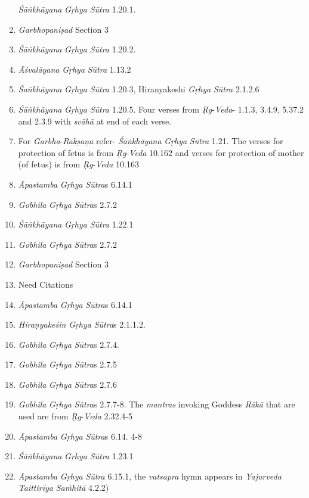 \begin{enumerate}
  \emph{Śāṅkhāyana} \emph{Gṛhya} \emph{Sūtra} 1.20.1.
\item
  \emph{Garbhopaniṣad} Section 3
\item
  \emph{Śāṅkhāyana} \emph{Gṛhya} \emph{Sūtra} 1.20.2.
\item
  \emph{Āśvalāyana} \emph{Gṛhya} \emph{Sūtra} 1.13.2
\item
  \emph{Śaṅkhāyana} \emph{Gṛhya} \emph{Sūtra} 1.20.3, Hiranyakeshi \emph{Gṛhya} \emph{Sūtra} 2.1.2.6
\item
  \emph{Śāṅkhāyana} \emph{Gṛhya} \emph{Sūtra} 1.20.5. Four verses from \emph{Ṛg}-\emph{Veda}- 1.1.3, 3.4.9, 5.37.2 and 2.3.9 with \emph{svāhā} at end of each verse.
\item
  For \emph{Garbha}-\emph{Rakṣaṇa} refer- \emph{Śāṅkhāyana} \emph{Gṛhya} \emph{Sūtra} 1.21. The verses for protection of fetus is from \emph{Ṛg}-\emph{Veda} 10.162 and verses for protection of mother (of fetus) is from \emph{Ṛg}-\emph{Veda} 10.163
\item
  \emph{Āpastamba} \emph{Gṛhya} \emph{Sūtra}s 6.14.1
\item
  \emph{Gobhila} \emph{Gṛhya} \emph{Sūtra}s 2.7.2
\item
  \emph{Śāṅkhāyana} \emph{Gṛhya} \emph{Sūtra} 1.22.1
\item
  \emph{Gobhila} \emph{Gṛhya} \emph{Sūtra}s 2.7.2
\item
  \emph{Garbhopaniṣad} Section 3
\item
  Need Citations
\item
  \emph{Āpastamba} \emph{Gṛhya} \emph{Sūtra}s 6.14.1
\item
  \emph{Hiraṇyakeśin} \emph{Gṛhya} \emph{Sūtra}s 2.1.1.2.
\item
  \emph{Gobhila} \emph{Gṛhya} \emph{Sūtra}s 2.7.4.
\item
  \emph{Gobhila} \emph{Gṛhya} \emph{Sūtra}s 2.7.5
\item
  \emph{Gobhila} \emph{Gṛhya} \emph{Sūtra}s 2.7.6
\item
  \emph{Gobhila} \emph{Gṛhya} \emph{Sūtra}s 2.7.7-8. The \emph{mantras} invoking Goddess \emph{Rākā} that are used are from \emph{Ṛg}-\emph{Veda} 2.32.4-5
\item
  \emph{Āpastamba} \emph{Gṛhya} \emph{Sūtra}s 6.14. 4-8
\item
  \emph{Śāṅkhāyana} \emph{Gṛhya} \emph{Sūtra} 1.23.1
\item
  \emph{Āpastamba} \emph{Gṛhya} \emph{Sūtra} 6.15.1, the \emph{vatsapra} hymn appears in \emph{Yajurveda} \emph{Taittirīya} \emph{Saṁhitā} 4.2.2)

\end{enumerate}
